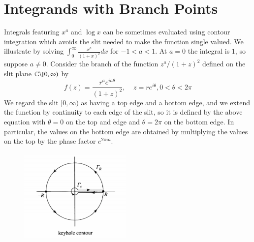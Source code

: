\documentclass[12pt, a4paper, oneside, openright, titlepage]{book}
\begin{document}
\section{Integrands with Branch Points}


Integrals featuring $x^a$ and $\log x$ can be sometimes evaluated using contour integration which avoids the slit needed to make the function single valued. We illustrate by solving $\int_0^{\infty}\frac{x^a}{(1+x)^2}dx$ for $-1<a<1$. At $a = 0$ the integral is $1$, so suppose $a \neq 0$. Consider the branch of the function $z^a/(1+z)^2$ defined on the slit plane $\mathbb C\backslash[0,\infty)$ by \begin{equation*}
    f(z) = \frac{r^ae^{ia\theta}}{(1+z)^2},\;\;\;\;z=re^{i\theta},0<\theta<2\pi
\end{equation*}
We regard the slit $[0,\infty)$ as having a top edge and a bottom edge, and we extend the function by continuity to each edge of the slit, so it is defined by the above equation with $\theta = 0$ on the top and edge and $\theta = 2\pi$ on the bottom edge. In particular, the values on the bottom edge are obtained by multiplying the values on the top by the phase factor $e^{2\pi ia}$. 

\begin{figure}
    \includegraphics[width = 5.5cm]{Keyhole.PNG}
    \label{fig:key}
\end{figure}
\end{document}
